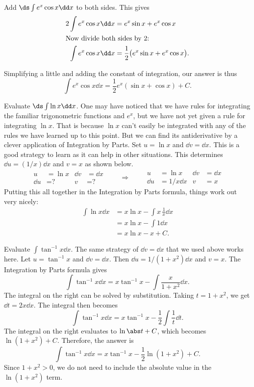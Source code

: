 \begin{example}
Add $\ds\int e^x\cos x\dd x$ to both sides. This gives 
\begin{align*}
2\int e^x\cos x\dd x & = e^x\sin x + e^x\cos x \\
\intertext{Now divide both sides by 2:}
\int e^x\cos x\dd x & = \frac{1}{2}\bigl(e^x\sin x + e^x\cos x\bigr).
\end{align*}

Simplifying a little and adding the constant of integration, our answer is thus
\[\int e^x\cos x\dd x = \frac12e^x\left(\sin x + \cos x\right)+C.\]
\end{example}

\begin{example}\label{ex_ibp5}
Evaluate $\ds\int \ln x\dd x$.
\solution
One may have noticed that we have rules for integrating the familiar trigonometric functions and $e^x$, but we have not yet given a rule for integrating $\ln x$.  That is because $\ln x$ can't easily be integrated with any of the rules we have learned up to this point.  But we can find its antiderivative by a clever application of Integration by Parts.  Set $u=\ln x$ and $\dd v=\dd x$.  This is a good strategy to learn as it can help in other situations. This determines $\dd u=(1/x)\dd x$ and $v=x$ as shown below.
\[
\begin{aligned}
u&= \ln x & \dd v&=\dd x\\
\dd u&= \text{?} & v&=\text{?}
\end{aligned}
\qquad\Rightarrow\qquad
\begin{aligned}
u&= \ln x& \dd v&=\dd x\\
\dd u&= 1/x\dd x & v&=x
\end{aligned}
\]
Putting this all together in the Integration by Parts formula, things work out very nicely:
\begin{align*}
 \int \ln x\dd x
 &= x\ln x - \int x\,\frac1x\dd x \\
 &= x\ln x - \int 1\dd x \\
 &= x\ln x - x + C.
\end{align*}
\end{example}

\begin{example}\label{ex_ibp6}
Evaluate $\displaystyle \int \tan^{-1} x\dd x$.
\solution
The same strategy of $\dd v=\dd x$ that we used above works here.  Let $u=\tan^{-1} x$ and $\dd v=\dd x$.  Then $\dd u=1/(1+x^2)\dd x$ and $v=x$.  The Integration by Parts formula gives
\[\int \tan^{-1} x\dd x = x\tan^{-1} x - \int \frac x{1+x^2}\dd x.\]
The integral on the right can be solved by substitution.  Taking $t=1+x^2$, we get $\dd t=2x\dd x$.  The integral then becomes
\[\int \tan^{-1} x\dd x = x\tan^{-1} x - \frac12\int \frac 1{t}\dd t.\]
The integral on the right evaluates to $\ln\abs t+C$, which becomes $\ln(1+x^2)+C$.  Therefore, the answer is
\[\int \tan^{-1} x\dd x = x\tan^{-1} x - \frac12\ln(1+x^2) + C.\]
Since $1+x^2>0$, we do not need to include the absolute value in the $\ln(1+x^2)$ term.
\end{example}

